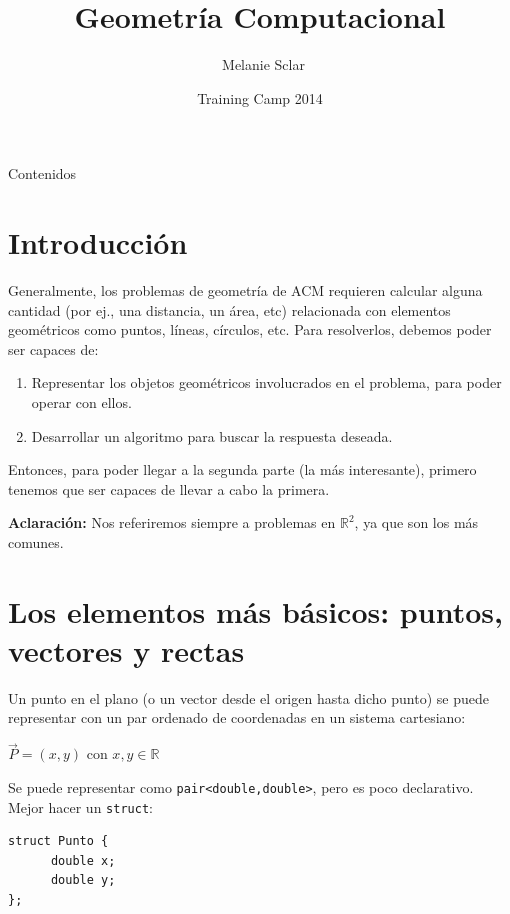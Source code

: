 \documentclass[compress]{beamer}
\title[Geometr\'ia Computacional] %
{Geometr\'ia Computacional}
\author[Melanie Sclar] %
{~Melanie Sclar}
\institute[UBA] %
{
  Facultad de Ciencias Exactas y Naturales\\
  Universidad de Buenos Aires
}
\date[TC 2014] %
{Training Camp 2014}
\begin{document}
\begin{frame}
  \titlepage
\end{frame}

\begin{frame}{Contenidos}
  \tableofcontents
\end{frame}

\section{Introducci\'on}
\begin{frame}

Generalmente, los problemas de geometr\'ia de ACM requieren calcular 
alguna cantidad (por ej., una distancia, un \'area, etc) relacionada con
elementos geom\'etricos como puntos, l\'ineas, c\'irculos, etc.
Para resolverlos, debemos poder ser capaces de:\\
\bigskip
\begin{enumerate}
\item Representar los objetos geom\'etricos involucrados en el problema, 
para poder operar con ellos.

\item Desarrollar un algoritmo para buscar la respuesta deseada.
\end{enumerate}

Entonces, para poder llegar a la segunda parte (la m\'as interesante), primero tenemos que ser capaces de llevar a cabo la primera.

\bigskip

\textbf{Aclaraci\'on:} Nos referiremos siempre a problemas en $\mathbb{R}^2$, ya que son los m\'as comunes.

\end{frame}

\section{Los elementos m\'as b\'asicos: puntos, vectores y rectas}
\begin{frame}[fragile]
Un punto en el plano (o un vector desde el origen hasta dicho punto) se puede representar con un par ordenado de coordenadas en un sistema cartesiano:

\begin{center}
$\vec{P} = (x,y)$ con $x,y \in \mathbb{R}$
\end{center}

\bigskip

Se puede representar como {\tt pair<double,double>}, pero es poco declarativo. Mejor hacer un {\tt struct}:

\begin{lstlisting}
struct Punto {
      double x;
      double y;
};
\end{lstlisting}

\end{frame}
\end{document}
